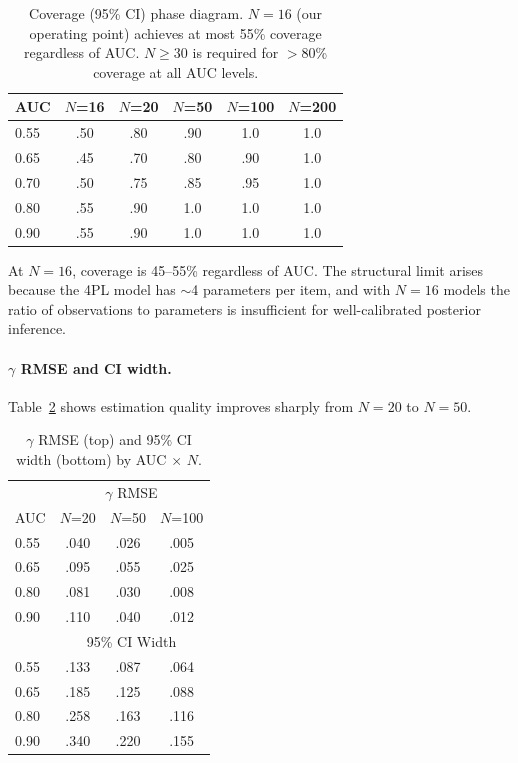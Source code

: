 \documentclass[11pt,a4paper]{article}
\begin{document}
\begin{table}[t]
\centering
\small
\caption{Coverage (95\% CI) phase diagram. $N{=}16$ (our operating point) achieves at most 55\% coverage regardless of AUC. $N{\geq}30$ is required for $>$80\% coverage at all AUC levels.}
\label{tab:phase_diagram}
\begin{tabular}{lccccc}
\toprule
AUC & $N$=16 & $N$=20 & $N$=50 & $N$=100 & $N$=200 \\
\midrule
0.55 & .50 & .80 & .90 & 1.0 & 1.0 \\
0.65 & .45 & .70 & .80 & .90 & 1.0 \\
0.70 & .50 & .75 & .85 & .95 & 1.0 \\
0.80 & .55 & .90 & 1.0 & 1.0 & 1.0 \\
0.90 & .55 & .90 & 1.0 & 1.0 & 1.0 \\
\bottomrule
\end{tabular}
\end{table}

At $N{=}16$, coverage is 45--55\% regardless of AUC. The structural limit arises because the 4PL model has $\sim$4 parameters per item, and with $N{=}16$ models the ratio of observations to parameters is insufficient for well-calibrated posterior inference.

\paragraph{$\gamma$ RMSE and CI width.} Table~\ref{tab:gamma_rmse} shows estimation quality improves sharply from $N{=}20$ to $N{=}50$.

\begin{table}[t]
\centering
\small
\caption{$\gamma$ RMSE (top) and 95\% CI width (bottom) by AUC $\times$ $N$.}
\label{tab:gamma_rmse}
\begin{tabular}{lccc}
\toprule
 & \multicolumn{3}{c}{$\gamma$ RMSE} \\
AUC & $N$=20 & $N$=50 & $N$=100 \\
\midrule
0.55 & .040 & .026 & .005 \\
0.65 & .095 & .055 & .025 \\
0.80 & .081 & .030 & .008 \\
0.90 & .110 & .040 & .012 \\
\midrule
 & \multicolumn{3}{c}{95\% CI Width} \\
\midrule
0.55 & .133 & .087 & .064 \\
0.65 & .185 & .125 & .088 \\
0.80 & .258 & .163 & .116 \\
0.90 & .340 & .220 & .155 \\
\bottomrule
\end{tabular}
\end{table}
\end{document}

